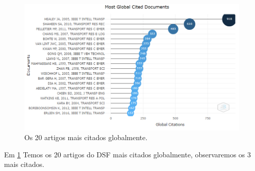 \begin{figure}
    \centering
    \includegraphics[width=1\textwidth]{experiments/MoustacheGolem/T1/img5MostGlobalCitedDocuments.PNG}%
    \caption{Os 20 artigos mais citados globalmente.}
    \label{fig:evol:MaisCita:DSF@MoustacheGolem}
\end{figure}


Em \ref{fig:evol:MaisCita:DSF@MoustacheGolem} Temos os 20 artigos do DSF mais citados globalmente, observaremos os 3 mais citados.


